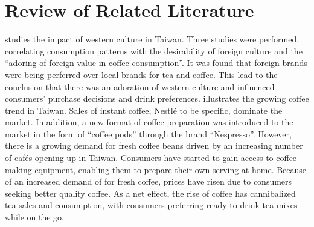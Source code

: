 \section{Review of Related Literature}

\autocite{su_impact_2006} studies the impact of western culture in Taiwan. Three
studies were performed, correlating consumption patterns with the desirability
of foreign culture and the ``adoring of foreign value in coffee consumption''.
It was found that foreign brands were being perferred over local brands for tea
and coffee. This lead to the conclusion that there was an adoration of western
culture and influenced consumers' purchase decisions and drink preferences.
\autocite{euromonitor_international_coffee_2015} illustrates the growing coffee
trend in Taiwan. Sales of instant coffee, Nestlé to be specific, dominate the
market. In addition, a new format of coffee preparation was introduced to the
market in the form of ``coffee pods'' through the brand ``Nespresso''. However,
there is a growing demand for fresh coffee beans driven by an increasing number
of cafés opening up in Taiwan. Consumers have started to gain access to coffee
making equipment, enabling them to prepare their own serving at home. Because of
an increased demand of for fresh coffee, prices have risen due to consumers
seeking better quality coffee. As a net effect, the rise of coffee has
cannibalized tea sales and consumption, with consumers preferring ready-to-drink
tea mixes while on the go.
